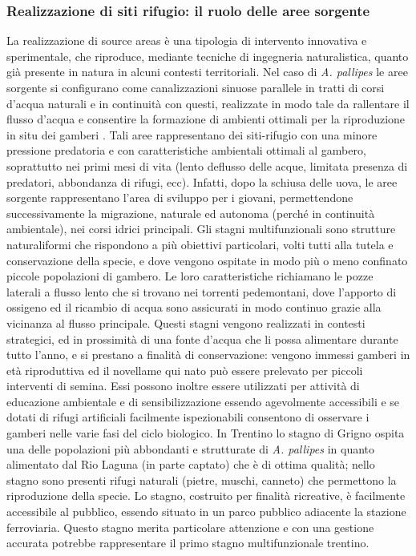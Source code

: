 \documentclass[11pt,a4paper,italian,twoside,openany]{memoir}
\begin{document}
\subsubsection{Realizzazione di siti rifugio: il ruolo delle aree sorgente}
La realizzazione di source areas è una tipologia di intervento innovativa e sperimentale, che riproduce, mediante tecniche di ingegneria naturalistica, quanto già presente in natura in alcuni contesti territoriali. Nel caso di \emph{A. pallipes} le aree sorgente si configurano come canalizzazioni sinuose parallele in tratti di corsi d'acqua naturali e in continuità con questi, realizzate in modo tale da rallentare il flusso d'acqua e consentire la formazione di ambienti ottimali per la riproduzione in situ dei gamberi \cite{AA.VV. 2014}. Tali aree rappresentano dei siti-rifugio con una minore pressione predatoria e con caratteristiche ambientali ottimali al gambero, soprattutto nei primi mesi di vita (lento deflusso delle acque, limitata presenza di predatori, abbondanza di rifugi, ecc). Infatti, dopo la schiusa delle uova, le aree sorgente rappresentano l'area di sviluppo per i giovani, permettendone successivamente la migrazione, naturale ed autonoma (perché in continuità ambientale), nei corsi idrici principali. Gli stagni multifunzionali sono strutture naturaliformi che rispondono a più obiettivi particolari, volti tutti alla tutela e conservazione della specie, e dove vengono ospitate in modo più o meno confinato piccole popolazioni di gambero. Le loro caratteristiche richiamano le pozze laterali a flusso lento che si trovano nei torrenti pedemontani, dove l'apporto di ossigeno ed il ricambio di acqua sono assicurati in modo continuo grazie alla vicinanza al flusso principale. Questi stagni vengono realizzati in contesti strategici, ed in prossimità di una fonte d'acqua che li possa alimentare durante tutto l'anno, e si prestano a finalità di conservazione: vengono immessi gamberi in età riproduttiva ed il novellame qui nato può essere prelevato per piccoli interventi di semina. Essi possono inoltre essere utilizzati per attività di educazione ambientale e di sensibilizzazione essendo agevolmente accessibili e se dotati di rifugi artificiali facilmente ispezionabili consentono di osservare i gamberi nelle varie fasi del ciclo biologico. 
In Trentino lo stagno di Grigno ospita una delle popolazioni più abbondanti e strutturate di \emph{A. pallipes} in quanto alimentato dal Rio Laguna (in parte captato) che è di ottima qualità; nello stagno sono presenti rifugi naturali (pietre, muschi, canneto) che permettono la riproduzione della specie. Lo stagno, costruito per finalità ricreative, è facilmente accessibile al pubblico, essendo situato in un parco pubblico adiacente la stazione ferroviaria. Questo stagno merita particolare attenzione e con una gestione accurata potrebbe rappresentare il primo stagno multifunzionale trentino.
\end{document}
